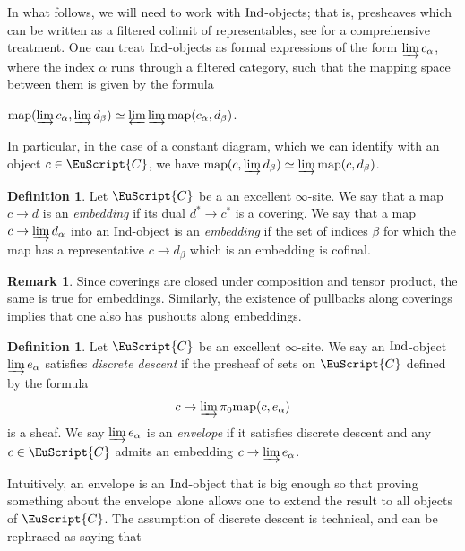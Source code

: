 \documentclass[oneside,a4paper]{amsart}
\newcommand{\euscr}[1]{\EuScript{#1}} %
\newcommand{\ccat}{\euscr{C}} %
\newcommand{\Ind}{\textnormal{Ind}} %
\newcommand{\map}{\textnormal{map}} %
\theoremstyle{plain}
\theoremstyle{definition}
\newtheorem{defin}[thm]{Definition}
\newtheorem{rem}[thm]{Remark}
\theoremstyle{remark}
\begin{document}
In what follows, we will need to work with $\Ind$-objects; that is, presheaves which can be written as a filtered colimit of representables, see \cite[5.3]{lurie_higher_topos_theory} for a comprehensive treatment. One can treat $\Ind$-objects as formal expressions of the form $\varinjlim c_{\alpha}$, where the index $\alpha$ runs through a filtered category, such that the mapping space between them is given by the formula

\begin{center}
$\map(\varinjlim c_{\alpha}, \varinjlim d_{\beta}) \simeq \varprojlim \varinjlim \map(c_{\alpha}, d_{\beta})$.
\end{center}
In particular, in the case of a constant diagram, which we can identify with an object $c \in \ccat$, we have $\map(c, \varinjlim d_{\beta}) \simeq \varinjlim \map(c, d_{\beta})$. 

\begin{defin}
Let $\ccat$ be a an excellent $\infty$-site. We say that a map $c \rightarrow d$ is an \emph{embedding} if its dual $d^{*} \rightarrow c^{*}$ is a covering.  We say that a map $c \rightarrow \varinjlim d_{\alpha}$ into an Ind-object is an \emph{embedding} if the set of indices $\beta$ for which the map has a representative $c \rightarrow d_{\beta}$ which is an embedding is cofinal.
\end{defin}

\begin{rem}
Since coverings are closed under composition and tensor product, the same is true for embeddings. Similarly, the existence of pullbacks along coverings implies that one also has pushouts along embeddings. 
\end{rem}

\begin{defin}
Let $\ccat$ be an excellent $\infty$-site. We say an $\Ind$-object $\varinjlim e_{\alpha}$ satisfies \emph{discrete descent} if the presheaf of sets on $\ccat$ defined by the formula
\[
c \mapsto \varinjlim \pi_{0} \map(c, e_{\alpha})
\]
is a sheaf. We say $\varinjlim e_{\alpha}$ is an \emph{envelope} if it satisfies discrete descent and any $c \in \ccat$ admits an embedding $c \rightarrow \varinjlim e_{\alpha}$.
\end{defin}
Intuitively, an envelope is an $\Ind$-object that is big enough so that proving something about the envelope alone allows one to extend the result to all objects of $\ccat$. The assumption of discrete descent is technical, and can be rephrased as saying that 
\end{document}
